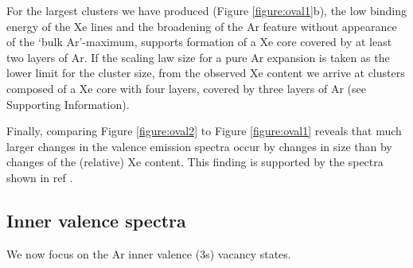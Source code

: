 For the largest clusters we have produced (Figure \ref{figure:oval1}b), the low binding energy of the Xe lines and the broadening of the Ar feature without appearance of the `bulk Ar'-maximum, supports formation of a Xe core covered by at least two layers of Ar.
If the scaling law size for a pure Ar expansion is taken as the lower limit for the cluster size, from the observed Xe content we arrive at clusters composed of a Xe core with four layers, covered by three layers of Ar (see Supporting Information).

Finally, comparing Figure \ref{figure:oval2} to Figure \ref{figure:oval1} reveals that much larger changes in the valence emission spectra occur by changes in size than by changes of the (relative) Xe content.
This finding is supported by the spectra shown in ref .
%
%
\subsection{Inner valence spectra}
%
We now focus on the Ar inner valence (3s) vacancy states. 
%
